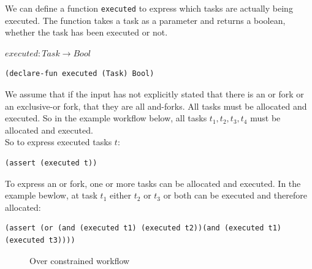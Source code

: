 \documentclass[a4paper]{report}
\begin{document}
We can define a function \texttt{executed} to express which tasks are actually being executed. The function takes a task as a parameter and returns a boolean, whether the task has been executed or not.
\begin{center}
$executed : Task \longrightarrow Bool$
\end{center}
\begin{lstlisting}[frame=single]
(declare-fun executed (Task) Bool)
\end{lstlisting}

We assume that if the input has not explicitly stated that there is an or fork or an exclusive-or fork, that they are all and-forks. All tasks must be allocated and executed. So in the example workflow below, all tasks $t_1, t_2, t_3, t_4$ must be allocated and executed. \\

So to express executed tasks $t$:
\begin{lstlisting}[frame=single]
(assert (executed t))
\end{lstlisting}
\begin{center}
\end{center}

To express an or fork, one or more tasks can be allocated and executed. In the example bewlow, at task $t_1$ either $t_2$ or $t_3$ or both can be executed and therefore allocated:
\begin{lstlisting}[frame=single]
(assert (or (and (executed t1) (executed t2))(and (executed t1) (executed t3))))
\end{lstlisting}
\begin{figure}[!htb]
\centering
{}
\caption{Over constrained workflow}
\label{fig:Over constrained workflow}
\end{figure}
\end{document}
